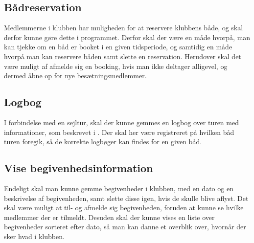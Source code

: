 \subsection{Bådreservation}

Medlemmerne i klubben har muligheden for at reservere klubbens både, og skal derfor kunne gøre dette i programmet.
Derfor skal der være en måde hvorpå, man kan tjekke om en båd er booket i en given tidsperiode, og samtidig en måde hvorpå man kan reservere båden samt slette en reservation.
Herudover skal det være muligt af afmelde sig en booking, hvis man ikke deltager alligevel, og dermed åbne op for nye besætningsmedlemmer.


\subsection{Logbog}

I forbindelse med en sejltur, skal der kunne gemmes en logbog over turen med informationer, som beskrevet i .
Der skal her være registreret på hvilken båd turen foregik, så de korrekte logbøger kan findes for en given båd.

\subsection{Vise begivenhedsinformation} 

Endeligt skal man kunne gemme begivenheder i klubben, med en dato og en beskrivelse af begivenheden, samt slette disse igen, hvis de skulle blive aflyst. 
Det skal være muligt at til- og afmelde sig begivenheden, foruden at kunne se hvilke medlemmer der er tilmeldt.
Desuden skal der kunne vises en liste over begivenheder sorteret efter dato, så man kan danne et overblik over, hvornår der sker hvad i klubben.
